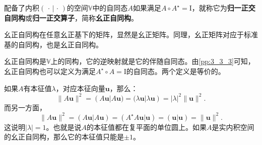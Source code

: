\documentclass[12pt,UTF8,fontset=none]{ctexbook}
\begin{document}
\begin{df}\label{df:8_1}
配备了内积$(\,\cdot\, | \,\cdot\,)$的空间$\mathbb{V}$中的自同态$A$如果满足$A\circ A^\star = \mathrm{I}$，就称它为\textbf{归一正交自同构}或\textbf{归一正交算子}，简称\textbf{幺正自同构}。
\end{df}
幺正自同构在任意幺正基下的矩阵，显然是幺正矩阵。同理，幺正矩阵对应于标准基的自同构，也是幺正自同构。

幺正自同构是$\mathbb{V}$上的同构，它的逆映射就是它的伴随自同态。由\ref{pp:3_3_3}可知，幺正自同构也可以定义为满足$A^\star\circ A = \mathrm{I}$的自同态。两个定义是等价的。

如果$A$有本征值$\lambda$，对应本征向量$\mathbf{u}$，那么：
$$ \| A\mathbf{u}\|^2 = (A\mathbf{u}|A\mathbf{u}) = (\lambda\mathbf{u}| \lambda\mathbf{u}) = |\lambda|^2 \|\mathbf{u}\|^2. $$
而另一方面，
$$ \| A\mathbf{u}\|^2 = (A\mathbf{u}|A\mathbf{u}) = (A^\star A\mathbf{u}|\mathbf{u}) = (\mathbf{u}|\mathbf{u}) = \|\mathbf{u}\|^2. $$
这说明$|\lambda| = 1$。也就是说$A$的本征值都在复平面的单位圆上。如果$A$是实内积空间的幺正自同构，那么它的本征值只能是$\pm 1$。
\end{document}
